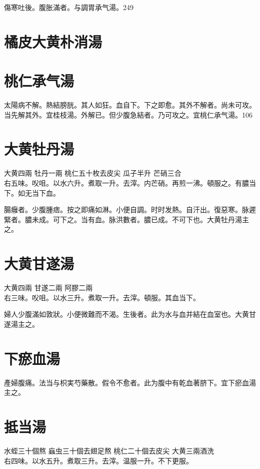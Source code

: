 傷寒吐後。腹胀滿者。与{\khaaitp 調胃}承气湯。249

\section{橘皮大黄朴消湯}

\section{桃仁承气湯}

太陽病不解。熱結膀胱。其人如狂。血自下。下之即愈。其外不解者。尚未可攻。当先解其外。{\khaaitp 宜桂枝湯。}外解已。{\khaaitp 但}少腹急結者。乃可攻之。宜桃仁承气湯。106

\section{大黄牡丹湯}

大黄{\scriptsize 四兩} 牡丹{\scriptsize 一兩} 桃仁{\scriptsize 五十枚去皮尖} 瓜子{\scriptsize 半升} 芒硝{\scriptsize 三合}\\
右五味。㕮咀。以水六升。煮取一升。去滓。内芒硝。再煎一沸。頓服之。有膿当下。如无当下血。

腸癰者。少腹腫痞。按之即痛如淋。小便自調。时时发熱。自汗出。復惡寒。脉遲緊者。膿未成。可下之。当有血。脉洪數者。膿已成。不可下也。大黄牡丹湯主之。

\section{大黄甘遂湯}

大黄{\scriptsize 四兩} 甘遂{\scriptsize 二兩} 阿膠{\scriptsize 二兩}\\
右三味。㕮咀。以水三升。煮取一升。去滓。頓服。其血当下。

婦人少腹滿如敦狀。小便微難而不渴。生後者。此为水与血并結在血室也。大黄甘遂湯主之。

\section{下瘀血湯}

產婦腹痛。法当与枳実芍藥散。假令不愈者。此为腹中有乾血著脐下。宜下瘀血湯主之。

\section{抵当湯}

水蛭{\scriptsize 三十個熬} 蝱虫{\scriptsize 三十個去翅足熬} 桃仁{\scriptsize 二十個去皮尖} 大黄{\scriptsize 三兩酒洗}\\
右四味。以水五升。煮取三升。去滓。温服一升。不下更服。{\zhaoben}

